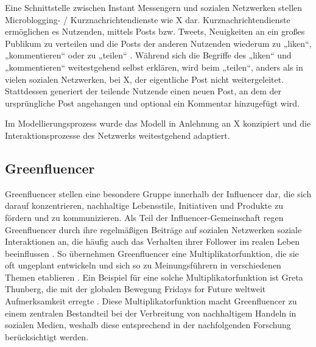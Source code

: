 \documentclass[runningheads]{llncs}
\begin{document}
Eine Schnittstelle zwischen Instant Messengern und sozialen Netzwerken stellen Microblogging- / Kurznachrichtendienste wie X dar. 
Kurznachrichtendienste ermöglichen es Nutzenden, mittels Posts bzw. Tweets, Neuigkeiten an ein großes Publikum zu verteilen und die Posts der anderen Nutzenden wiederum zu „liken“, „kommentieren“ oder zu „teilen“ \cite{bendel_definition_nodate}. 
Während sich die Begriffe des „liken“ und „kommentieren“ weitestgehend selbst erklären, wird beim „teilen“, anders als in vielen sozialen Netzwerken, bei X, der eigentliche Post nicht weitergeleitet. Stattdessen generiert der teilende Nutzende einen neuen Post, an dem der ursprüngliche Post angehangen und optional ein Kommentar hinzugefügt wird.

Im Modellierungsprozess wurde das Modell in Anlehnung an X konzipiert und die Interaktionsprozesse des Netzwerks weitestgehend adaptiert. 

\subsection{Greenfluencer}\label{greenfluencer}
Greenfluencer stellen eine besondere Gruppe innerhalb der Influencer dar, die sich darauf konzentrieren, nachhaltige Lebensstile, Initiativen und Produkte zu fördern und zu kommunizieren. 
Als Teil der Influencer-Gemeinschaft regen Greenfluencer durch ihre regelmäßigen Beiträge auf  sozialen Netzwerken soziale Interaktionen an, die häufig auch das Verhalten ihrer Follower im realen Leben beeinflussen \cite{cavazos-arroyo_influence_2023}. 
So übernehmen Greenfluencer eine Multiplikatorfunktion, die sie oft ungeplant entwickeln und sich so zu Meinungsführern in verschiedenen Themen etablieren \cite{deges_definition_nodate}.
Ein Beispiel für eine solche Multiplikatorfunktion ist Greta Thunberg, die mit der globalen Bewegung Fridays for Future weltweit Aufmerksamkeit erregte \cite{toyka-seid_fridays_2024}.
Diese Multiplikatorfunktion macht Greenfluencer zu einem zentralen Bestandteil bei der Verbreitung von nachhaltigem Handeln in sozialen Medien, weshalb diese entsprechend in der nachfolgenden Forschung berücksichtigt werden. 
\end{document}
